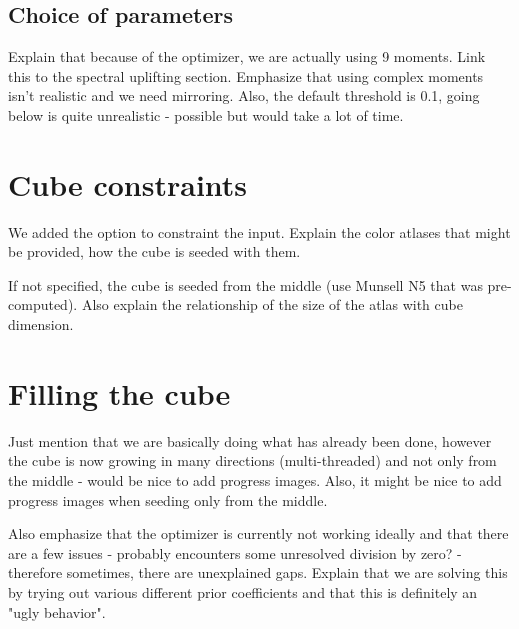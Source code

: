 \subsection{Choice of parameters}
Explain that because of the optimizer, we are actually using 9 moments. Link this to the spectral uplifting section. Emphasize that using complex moments isn't realistic and we need mirroring. Also, the default threshold is 0.1, going below is quite unrealistic - possible but would take a lot of time.

\section{Cube constraints}

We added the option to constraint the input. Explain the color atlases that might be provided, how the cube is seeded with them.

If not specified, the cube is seeded from the middle (use Munsell N5 that was pre-computed). Also explain the relationship of the size of the atlas with cube dimension.

\section{Filling the cube}
Just mention that we are basically doing what has already been done, however the cube is now growing in many directions (multi-threaded) and not only from the middle - would be nice to add progress images. Also, it might be nice to add progress images when seeding only from the middle.

Also emphasize that the optimizer is currently not working ideally and that there are a few issues - probably encounters some unresolved division by zero? - therefore sometimes, there are unexplained gaps. Explain that we are solving this by trying out various different prior coefficients and that this is definitely an "ugly behavior".